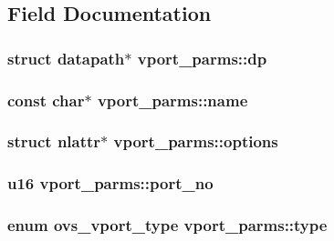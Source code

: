 \subsection{Field Documentation}
\hypertarget{structvport__parms_a15faa866e3d35a721de77b347017499e}{}
\subsubsection[{dp}]{\setlength{\rightskip}{0pt plus 5cm}struct {\bf datapath}$\ast$ vport\+\_\+parms\+::dp}\label{structvport__parms_a15faa866e3d35a721de77b347017499e}
\hypertarget{structvport__parms_a4f27e2a7b7dc0493c095cdaabe225b38}{}
\subsubsection[{name}]{\setlength{\rightskip}{0pt plus 5cm}const char$\ast$ vport\+\_\+parms\+::name}\label{structvport__parms_a4f27e2a7b7dc0493c095cdaabe225b38}
\hypertarget{structvport__parms_a5c6027e758731e1a16968e77d4e2ca7c}{}
\subsubsection[{options}]{\setlength{\rightskip}{0pt plus 5cm}struct nlattr$\ast$ vport\+\_\+parms\+::options}\label{structvport__parms_a5c6027e758731e1a16968e77d4e2ca7c}
\hypertarget{structvport__parms_a5bc77ace899b9bbdb6d7f833b31c009a}{}
\subsubsection[{port\+\_\+no}]{\setlength{\rightskip}{0pt plus 5cm}u16 vport\+\_\+parms\+::port\+\_\+no}\label{structvport__parms_a5bc77ace899b9bbdb6d7f833b31c009a}
\hypertarget{structvport__parms_ad79f91d20a33ff64cd72cad0b83ffae3}{}
\subsubsection[{type}]{\setlength{\rightskip}{0pt plus 5cm}enum {\bf ovs\+\_\+vport\+\_\+type} vport\+\_\+parms\+::type}\label{structvport__parms_ad79f91d20a33ff64cd72cad0b83ffae3}
\hypertarget{structvport__parms_ae9dbd12fddc1869a17229cef771a4d29}{}
